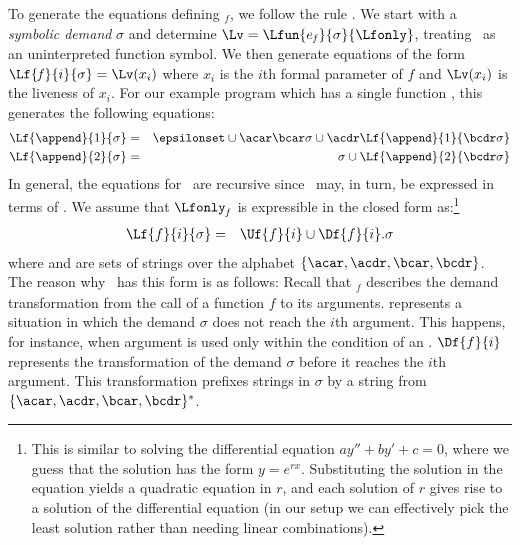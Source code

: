 To generate the equations defining \Lfonly$_{\mathit  f}$, we follow the rule  .   We start with a {\em symbolic demand}
$\sigma$  and determine $\Lv = \Lfun{e_{\mathit{f}}}  {\sigma}
{\Lfonly}$, treating \Lfonly\  as an uninterpreted function symbol.  We  then generate  equations of  the form
$\Lf{\mathit{f}}{i}{\sigma} = \Lv(x_i)$  where $x_i$ is the $i$th
formal parameter  of $\mathit{f}$ and $\Lv(x_i)$  is the liveness
of $x_i$.  For our example program which has  a
single function \append, this generates the following equations:
  \begin{eqnarray*}
    \Lf{\append}{1}{\sigma}
    &=& \epsilonset \cup \acar\bcar\sigma
    \cup \acdr\Lf{\append}{1}{\bcdr\sigma}\\ 
    \Lf{\append}{2}{\sigma}
    &=& \sigma \cup \Lf{\append}{2}{\bcdr\sigma} 
  \end{eqnarray*}
  In  general, the  equations  for \Lfonly\  are recursive  since
  \Lv\ may, in turn, be expressed in terms of \Lfonly.  We assume
  that $\Lfonly_{\mathit f}$ is expressible in the closed form as:\footnote{This
    is  similar to  solving the  differential equation  
    $\mathit{ay}''+\mathit{by}'+\mathit{c}  = 0$, where  we guess
    that    the    solution     has    the    form    $\mathit{y}
    =\mathit{e}^{\mathit{rx}}$.  Substituting the solution in the
    equation  yields  a  quadratic  equation  in  $r$,  and  each
    solution of $r$ gives rise  to a solution of the differential
    equation  (in our  setup we  can effectively  pick  the least
    solution rather than needing linear combinations).  }
\begin{eqnarray}
\label{eq:LF:DI}
  \Lf{f}{i}{\sigma} &=& \Uf{f}{i} \cup \Df{f}{i}.\sigma
\end{eqnarray}
where    and   are  sets  of  strings over  the
alphabet $\lbrace \acar, \acdr,\bcar, \bcdr \rbrace$.  The reason
why \Lfonly\ has this form  is as follows: Recall that
\Lfonly$_{\mathit  f}$ describes  the demand  transformation from
the call of a function ${\mathit f}$ to its arguments.  represents a
situation in which  the demand $\sigma$ does not  reach the $i$th
argument.   This happens,  for  instance, when  argument is  used
only within  the condition  of  an \SIF.   $\Df{f}{i}$ represents  the
transformation of the demand $\sigma$ before it reaches the $i$th
argument. This  transformation prefixes strings in 
$\sigma$ by a string from $\{\acar,\acdr,\bcar,\bcdr\}^*$.


